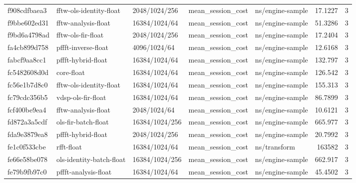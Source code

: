 \begin{longtable}{lllllrr}
f908cdfbaea3 & fftw-ols-identity-float & 2048/1024/256 & mean\_session\_cost & ns/engine-sample & 17.1227 & 3 \\
f9bbe602ed31 & fftw-analysis-float & 16384/1024/64 & mean\_session\_cost & ns/engine-sample & 51.3286 & 3 \\
f9bd6a4798ad & fftw-ols-fir-float & 2048/1024/256 & mean\_session\_cost & ns/engine-sample & 17.2404 & 3 \\
fa4cb899d758 & pffft-inverse-float & 4096/1024/64 & mean\_session\_cost & ns/engine-sample & 12.6168 & 3 \\
fabcf9aa8cc1 & pffft-hybrid-float & 16384/1024/64 & mean\_session\_cost & ns/engine-sample & 132.797 & 3 \\
fc5482608d0d & core-float & 16384/1024/64 & mean\_session\_cost & ns/engine-sample & 126.542 & 3 \\
fc56e1b7d8c0 & fftw-ols-identity-float & 16384/1024/64 & mean\_session\_cost & ns/engine-sample & 155.313 & 3 \\
fc79cdc356b5 & vdsp-ols-fir-float & 16384/1024/64 & mean\_session\_cost & ns/engine-sample & 86.7899 & 3 \\
fcf400be9ea4 & fftw-analysis-float & 2048/1024/64 & mean\_session\_cost & ns/engine-sample & 10.6121 & 3 \\
fd872a3a5cdf & ols-fir-batch-float & 16384/1024/256 & mean\_session\_cost & ns/engine-sample & 665.977 & 3 \\
fda9e3879ea8 & pffft-hybrid-float & 2048/1024/256 & mean\_session\_cost & ns/engine-sample & 20.7992 & 3 \\
fe1c0f533cbe & rfft-float & 16384/1024/64 & mean\_session\_cost & ns/transform & 163582 & 3 \\
fe66e58be078 & ols-identity-batch-float & 16384/1024/256 & mean\_session\_cost & ns/engine-sample & 662.917 & 3 \\
fe79b9fb97c0 & pffft-analysis-float & 16384/1024/64 & mean\_session\_cost & ns/engine-sample & 45.4502 & 3 \\
\end{longtable}
\endgroup
